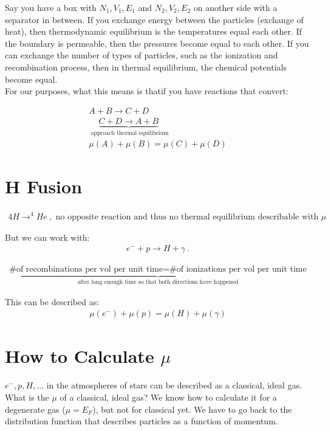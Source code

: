 \documentclass[10pt,letterpaper,final]{book}
\newcommand{\ra}{\rightarrow}
\begin{document}
Say you have a box with $N_1,V_1,E_1$ and $N_2,V_2,E_2$ on another side with a separator in between. If you exchange energy between the particles (exchange of heat), then thermodynamic equilibrium is the temperatures equal each other. If the boundary is permeable, then the pressures become equal to each other. If you can exchange the number of types of particles, such as the ionization and recombination process, then in thermal equilibrium, the chemical potentials become equal. \\

For our purposes, what this means is thatif you have reactions that convert:

\begin{align}
A + B \ra C + D\\
\underbrace{C + D \ra A + B}_{\text{ approach thermal equilibrium}}\\
\mu(A) + \mu(B) = \mu(C) + \mu(D)
\end{align}

\section{H Fusion}

\begin{align}
4 H \ra ^4He~,\text{ no opposite reaction and thus no thermal equilibrium describable with $\mu$}
\end{align}

But we can work with:
\begin{align}
e^- + p \ra H + \gamma~.
\end{align}

\begin{align}
\underbrace{\text{\# of recombinations per vol per unit time} = \text{\# of ionizations per vol per unit time}}_{\text{after long enough time so that both directions have happened}}
\end{align}

This can be described as:
\begin{align}
\mu(e^-) + \mu(p) = \mu(H) + \mu(\gamma)
\end{align}

\section{How to Calculate $\mu$}

$e^-,p,H,...$ in the atmospheres of stars can be described as a classical, ideal gas. What is the $\mu$ of a classical, ideal gas? We know how to calculate it for a degenerate gas ($\mu = E_F$), but not for classical yet. We have to go back to the distribution function that describes particles as a function of momentum. 
\end{document}
